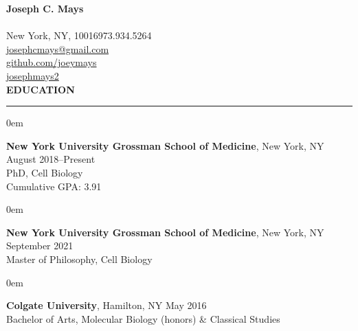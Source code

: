 \documentclass[10pt, letterpaper]{article} %
\newenvironment{CVSection}{
\begin{addmargin}[2em]{0em}
\begin{samepage}}
{\end{samepage}
\end{addmargin}\bigskip}
\newcommand{\CVHeading}[1]{
\MakeUppercase{\bf #1}
\smallskip
\hrule
\medskip
}
\begin{document}
{\Huge\textbf{Joseph C. Mays}}\\\\
\faHome\hspace{2 mm}New York, NY, 10016\hspace{4 mm}\faPhone\hspace{2.4 mm}973.934.5264\\
\faEnvelopeSquare\hspace{2.3 mm}\href{mailto:josephcmays+CV@gmail.com}{josephcmays@gmail.com}\\
\faGithub\hspace{2 mm}\href{https://github.com/joeymays}{github.com/joeymays}\\
\faLinkedin\hspace{2 mm}\href{https://www.linkedin.com/in/josephmays2/}{josephmays2}\\

\CVHeading{Education}
\begin{CVSection}
\textbf{New York University Grossman School of Medicine}, New York, NY \hfill August 2018--Present\\
PhD, Cell Biology\\
Cumulative GPA: 3.91
\end{CVSection}
\begin{CVSection}
\textbf{New York University Grossman School of Medicine}, New York, NY \hfill September 2021\\
Master of Philosophy, Cell Biology
\end{CVSection}
\begin{CVSection}
\textbf{Colgate University}, Hamilton, NY \hfill May 2016\\
Bachelor of Arts, Molecular Biology (honors) \& Classical Studies
\end{CVSection}
\end{document}

